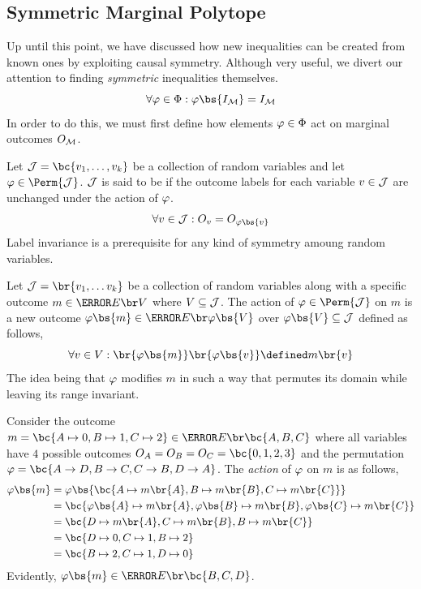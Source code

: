 \documentclass[aps, 10pt, english, twoside, pra, nofootinbib, longbibliography]{revtex4-1}
\begin{document}
    \subsection{Symmetric Marginal Polytope}
    Up until this point, we have discussed how new inequalities can be created from known ones by exploiting causal symmetry. Although very useful, we divert our attention to finding \textit{symmetric} inequalities themselves.
    \[ \forall \gep \in \gp :  \gep\bs{I_{\mscenario}} = I_{\mscenario} \]
    In order to do this, we must first define how elements $\varphi \in \Phi$ act on marginal outcomes $O_{\mathcal{M}}$.
    \begin{definition}
        Let $\jointvar = \bc{v_1, \ldots, v_k}$ be a collection of random variables and let $\gep \in \Perm{\jointvar}$. $\mathcal{J}$ is said to be  if the outcome labels for each variable $v \in \mathcal{J}$ are unchanged under the action of $\varphi$.
        \[ \forall v \in \jointvar : O_{v} = O_{\gep\bs{v}} \]
        Label invariance is a prerequisite for any kind of symmetry amoung random variables.
    \end{definition}
    \begin{definition}
        Let $\jointvar = \br{v_1, \ldots v_k}$ be a collection of random variables along with a specific outcome $m \in \Events{V}$ where $V \subseteq \mathcal{J}$. The action of $\gep \in \Perm{\jointvar}$ on $m$ is a new outcome $\gep\bs{m} \in \Events{\gep\bs{V}}$ over $\gep\bs{V} \subseteq \jointvar$ defined as follows,
        \[ \forall v \in V : \br{\gep\bs{m}}\br{\gep\bs{v}} \defined m \br{v} \]
        The idea being that $\varphi$ modifies $m$ in such a way that permutes its domain while leaving its range invariant.
    \end{definition}
    \begin{example}
        Consider the outcome $m = \bc{A \mapsto 0, B \mapsto 1, C \mapsto 2} \in \Events{\bc{A,B,C}}$ where all variables have $4$ possible outcomes $O_A = O_B = O_C = \bc{0,1,2,3}$ and the permutation $\gep = \bc{A \to D, B \to C, C \to B, D \to A}$.
        The \textit{action} of $\varphi$ on $m$ is as follows,
        \begin{align*}
            \gep\bs{m} &= \gep\bs{\bc{A \mapsto m\br{A}, B \mapsto m\br{B}, C \mapsto m\br{C}}} \\
            &= \bc{\gep\bs{A} \mapsto m\br{A}, \gep\bs{B} \mapsto m\br{B}, \gep\bs{C} \mapsto m\br{C}} \\
            &= \bc{D \mapsto m\br{A}, C \mapsto m\br{B}, B \mapsto m\br{C}} \\
            &= \bc{D \mapsto 0, C \mapsto 1, B \mapsto 2} \\
            &= \bc{B \mapsto 2, C \mapsto 1, D \mapsto 0}
        \end{align*}
        Evidently, $\gep\bs{m} \in \Events{\bc{B, C, D}}$.
    \end{example}
\end{document}

